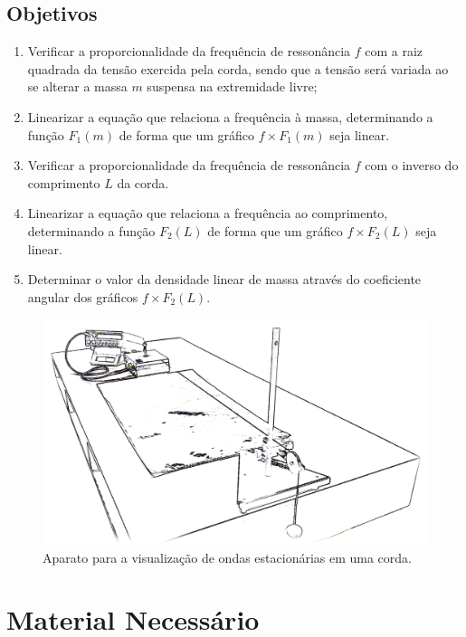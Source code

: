 \subsection{Objetivos}
\label{Sec:ObjetivosOndasEstacionarias}

\begin{enumerate}
	\item Verificar a proporcionalidade da frequência de ressonância $f$ com a raiz quadrada da tensão exercida pela corda, sendo que a tensão será variada ao se alterar a massa $m$ suspensa na extremidade livre;
	\item Linearizar a equação que relaciona a frequência à massa, determinando a função $F_1(m)$ de forma que um gráfico $f \times F_1(m)$ seja linear.
	\item Verificar a proporcionalidade da frequência de ressonância $f$ com o inverso do comprimento $L$ da corda.
	\item Linearizar a equação que relaciona a frequência ao comprimento, determinando a função $F_2(L)$ de forma que um gráfico $f \times F_2(L)$ seja linear.
	\item Determinar o valor da densidade linear de massa através do coeficiente angular dos gráficos $f \times F_2(L)$.
\end{enumerate}

\begin{figure}\forcerectofloat
	\centering
	\includegraphics[width=\textwidth]{Ilustrations/Ondas_estacionarias.png}
	\caption{Aparato para a visualização de ondas estacionárias em uma corda.}
\end{figure}

\section{Material Necessário}


